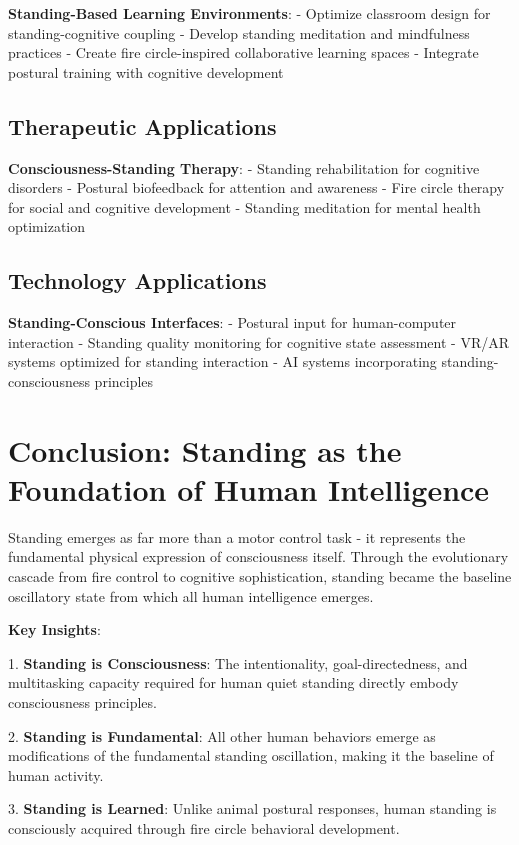 \documentclass[12pt]{article}
\begin{document}
\textbf{Standing-Based Learning Environments}:
- Optimize classroom design for standing-cognitive coupling
- Develop standing meditation and mindfulness practices
- Create fire circle-inspired collaborative learning spaces
- Integrate postural training with cognitive development

\subsection{Therapeutic Applications}

\textbf{Consciousness-Standing Therapy}:
- Standing rehabilitation for cognitive disorders
- Postural biofeedback for attention and awareness
- Fire circle therapy for social and cognitive development
- Standing meditation for mental health optimization

\subsection{Technology Applications}

\textbf{Standing-Conscious Interfaces}:
- Postural input for human-computer interaction
- Standing quality monitoring for cognitive state assessment
- VR/AR systems optimized for standing interaction
- AI systems incorporating standing-consciousness principles

\section{Conclusion: Standing as the Foundation of Human Intelligence}

Standing emerges as far more than a motor control task - it represents the fundamental physical expression of consciousness itself. Through the evolutionary cascade from fire control to cognitive sophistication, standing became the baseline oscillatory state from which all human intelligence emerges.

\textbf{Key Insights}:

1. \textbf{Standing is Consciousness}: The intentionality, goal-directedness, and multitasking capacity required for human quiet standing directly embody consciousness principles.

2. \textbf{Standing is Fundamental}: All other human behaviors emerge as modifications of the fundamental standing oscillation, making it the baseline of human activity.

3. \textbf{Standing is Learned}: Unlike animal postural responses, human standing is consciously acquired through fire circle behavioral development.
\end{document}
